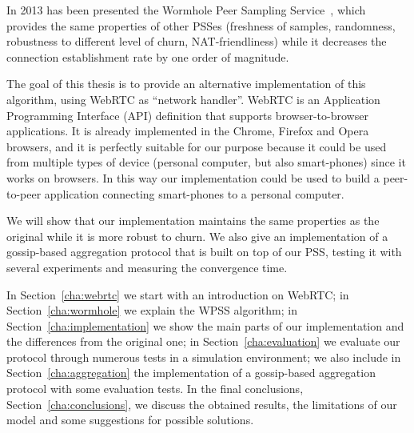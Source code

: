 In 2013 has been presented the Wormhole Peer Sampling Service~\cite{wormhole}, which provides the same properties of other PSSes (freshness of samples, randomness, robustness to different level of churn, NAT-friendliness) while it decreases the connection establishment rate by one order of magnitude. 

The goal of this thesis is to provide an alternative implementation of this algorithm, using WebRTC as ``network handler''. WebRTC is an Application Programming Interface (API) definition that supports browser-to-browser applications. It is already implemented in the Chrome, Firefox and Opera browsers, and it is perfectly suitable for our purpose because it could be used from multiple types of device (personal computer, but also smart-phones) since it works on browsers. In this way our implementation could be used to build a peer-to-peer application connecting smart-phones to a personal computer.

We will show that our implementation maintains the same properties as the original while it is more robust to churn. We also give an implementation of a gossip-based aggregation protocol that is built on top of our PSS, testing it with several experiments and measuring the convergence time.

In Section~\ref{cha:webrtc} we start with an introduction on WebRTC; in Section~\ref{cha:wormhole} we explain the WPSS algorithm; in Section~\ref{cha:implementation} we show the main parts of our implementation and the differences from the original one; in Section~\ref{cha:evaluation} we evaluate our protocol through numerous tests in a simulation environment; we also include in Section~\ref{cha:aggregation} the implementation of a gossip-based aggregation protocol with some evaluation tests. In the final conclusions, Section~\ref{cha:conclusions}, we discuss the obtained results, the limitations of our model and some suggestions for possible solutions.
